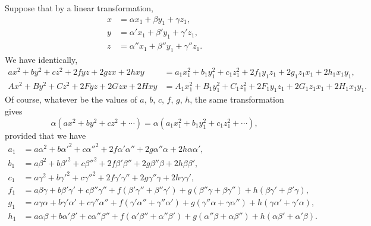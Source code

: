 \documentclass[11pt,a4paper]{article}
\theoremstyle{definition}
\begin{document}
Suppose that by a linear transformation,
\begin{align*}
x &= \alpha x_{1} + \beta y_{1} + \gamma z_{1}, \\
y &= \alpha' x_{1} + \beta' y_{1} + \gamma' z_{1}, \\
z &= \alpha'' x_{1} + \beta'' y_{1} + \gamma'' z_{1}.
\end{align*}
We have identically,
\begin{align*}
ax^{2} + by^{2} + cz^{2} + 2fyz + 2gzx + 2hxy &= a_{1}x_{1}^{2} + b_{1}y_{1}^{2} + c_{1}z_{1}^{2} + 2f_{1}y_{1}z_{1} + 2g_{1}z_{1}x_{1} + 2h_{1}x_{1}y_{1}, \\
Ax^{2} + By^{2} + Cz^{2} + 2Fyz + 2Gzx + 2Hxy &= A_{1}x_{1}^{2} + B_{1}y_{1}^{2} + C_{1}z_{1}^{2} + 2F_{1}y_{1}z_{1} + 2G_{1}z_{1}x_{1} + 2H_{1}x_{1}y_{1}.
\end{align*}
Of course, whatever be the values of $a$, $b$, $c$, $f$, $g$, $h$, the same transformation gives
\[
\alpha(ax^{2} + by^{2} + cz^{2} + \cdots) = \alpha(a_{1}x_{1}^{2} + b_{1}y_{1}^{2} + c_{1}z_{1}^{2} + \cdots),
\]
provided that we have
\begin{align*}
a_{1} &= a\alpha^{2} + b\alpha'^{2} + c\alpha''^{2} + 2f\alpha'\alpha'' + 2g\alpha''\alpha + 2h\alpha\alpha', \\
b_{1} &= a\beta^{2} + b\beta'^{2} + c\beta''^{2} + 2f\beta'\beta'' + 2g\beta''\beta + 2h\beta\beta', \\
c_{1} &= a\gamma^{2} + b\gamma'^{2} + c\gamma''^{2} + 2f\gamma'\gamma'' + 2g\gamma''\gamma + 2h\gamma\gamma', \\
f_{1} &= a\beta\gamma + b\beta'\gamma' + c\beta''\gamma'' + f(\beta'\gamma'' + \beta''\gamma') + g(\beta''\gamma + \beta\gamma'') + h(\beta\gamma' + \beta'\gamma), \\
g_{1} &= a\gamma\alpha + b\gamma'\alpha' + c\gamma''\alpha'' + f(\gamma'\alpha'' + \gamma''\alpha') + g(\gamma''\alpha + \gamma\alpha'') + h(\gamma\alpha' + \gamma'\alpha), \\
h_{1} &= a\alpha\beta + b\alpha'\beta' + c\alpha''\beta'' + f(\alpha'\beta'' + \alpha''\beta') + g(\alpha''\beta + \alpha\beta'') + h(\alpha\beta' + \alpha'\beta).
\end{align*}

\newpage

\setcounter{page}{429}
\end{document}
